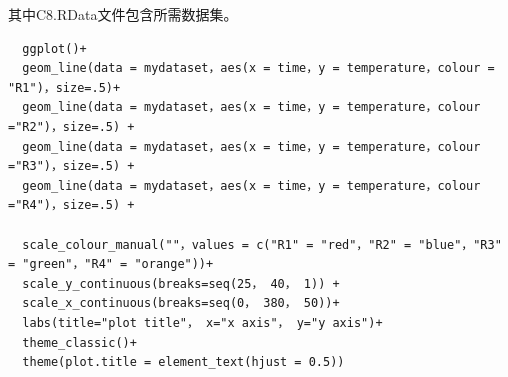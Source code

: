 \documentclass[10pt,a4paper,twoside,UTF8]{ctexart}
\begin{document}
其中C8.RData文件包含所需数据集。
\begin{lstlisting}
  ggplot()+
  geom_line(data = mydataset，aes(x = time，y = temperature，colour = "R1")，size=.5)+
  geom_line(data = mydataset，aes(x = time，y = temperature，colour ="R2")，size=.5) + 
  geom_line(data = mydataset，aes(x = time，y = temperature，colour ="R3")，size=.5) + 
  geom_line(data = mydataset，aes(x = time，y = temperature，colour ="R4")，size=.5) + 
  
  scale_colour_manual(""，values = c("R1" = "red"，"R2" = "blue"，"R3" = "green"，"R4" = "orange"))+
  scale_y_continuous(breaks=seq(25， 40， 1)) +
  scale_x_continuous(breaks=seq(0， 380， 50))+
  labs(title="plot title"， x="x axis"， y="y axis")+
  theme_classic()+
  theme(plot.title = element_text(hjust = 0.5))
\end{lstlisting}
\end{document}
